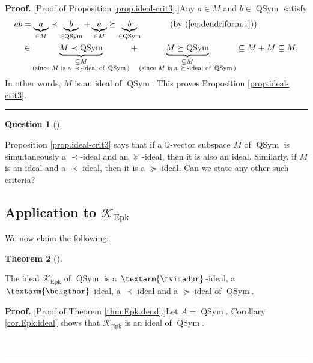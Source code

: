 \documentclass[numbers=enddot,12pt,final,onecolumn,notitlepage]{scrartcl}%
\theoremstyle{definition}
\newtheorem{theo}{Theorem}[section]
\newenvironment{theorem}[1][]
{\begin{theo}[#1]\begin{leftbar}}
{\end{leftbar}\end{theo}}
\newtheorem{quest}[theo]{Question}
\newenvironment{question}[1][]
{\begin{quest}[#1]\begin{leftbar}}
{\end{leftbar}\end{quest}}
\newenvironment{proof}[1][Proof]{\noindent\textbf{#1.} }{\ \rule{0.5em}{0.5em}}
\newenvironment{question}[1][Question]{\noindent\textbf{#1.} }{\ \rule{0.5em}{0.5em}}
\newenvironment{verlong}{}{}
\newcommand{\tvi}{\left. \textarm{\tvimadur} \right.}
\newcommand{\bel}{\left. \textarm{\belgthor} \right.}
\begin{document}
\begin{verlong}
\begin{proof}
[Proof of Proposition \ref{prop.ideal-crit3}.]Any $a\in M$ and $b\in
\operatorname*{QSym}$ satisfy%
\begin{align*}
ab  &  =\underbrace{a}_{\in M}\left.  \prec\right.  \underbrace{b}%
_{\in\operatorname*{QSym}}+\underbrace{a}_{\in M}\left.  \succeq\right.
\underbrace{b}_{\in\operatorname*{QSym}}\ \ \ \ \ \ \ \ \ \ \left(  \text{by
(\ref{eq.dendriform.1})}\right) \\
&  \in\underbrace{M\left.  \prec\right.  \operatorname*{QSym}}%
_{\substack{\subseteq M\\\text{(since }M\text{ is a }\left.  \prec\right.
\text{-ideal of }\operatorname*{QSym}\text{)}}}+\underbrace{M\left.
\succeq\right.  \operatorname*{QSym}}_{\substack{\subseteq M\\\text{(since
}M\text{ is a }\left.  \succeq\right.  \text{-ideal of }\operatorname*{QSym}%
\text{)}}}\subseteq M+M\subseteq M.
\end{align*}
In other words, $M$ is an ideal of $\operatorname*{QSym}$. This proves
Proposition \ref{prop.ideal-crit3}.
\end{proof}

\begin{question}
Proposition \ref{prop.ideal-crit3} says that if a $\mathbb{Q}$-vector subspace
$M$ of $\operatorname*{QSym}$ is simultaneously a $\left.  \prec\right.
$-ideal and an $\left.  \succeq\right.  $-ideal, then it is also an ideal.
Similarly, if $M$ is an ideal and a $\left.  \prec\right.  $-ideal, then it is
a $\left.  \succeq\right.  $-ideal. Can we state any other such criteria?
\end{question}

\subsection{Application to $\mathcal{K}_{\operatorname*{Epk}}$}

We now claim the following:

\begin{theorem}
\label{thm.Epk.dend}The ideal $\mathcal{K}_{\operatorname*{Epk}}$ of
$\operatorname*{QSym}$ is a $\tvi  $-ideal, a $\bel  $-ideal, a $\left.
\prec\right.  $-ideal and a $\left.  \succeq\right.  $-ideal of
$\operatorname*{QSym}$.
\end{theorem}

\begin{proof}
[Proof of Theorem \ref{thm.Epk.dend}.]Let $A=\operatorname*{QSym}$. Corollary
\ref{cor.Epk.ideal} shows that $\mathcal{K}_{\operatorname*{Epk}}$ is an ideal
of $\operatorname*{QSym}$.


\end{proof}
\end{verlong}
\end{document}
